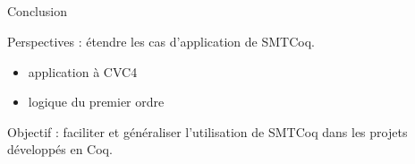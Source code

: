\documentclass{beamer}
\begin{document}
    \subsection{}
    \begin{frame}{Conclusion}
      
      Perspectives : étendre les cas d'application de SMTCoq.
      \begin{itemize}
      \item application à CVC4
      \item logique du premier ordre
      \end{itemize}

      \vspace{1cm}

      Objectif : faciliter et généraliser l'utilisation de SMTCoq dans les projets développés en Coq.

    \end{frame}


    
\end{document}
